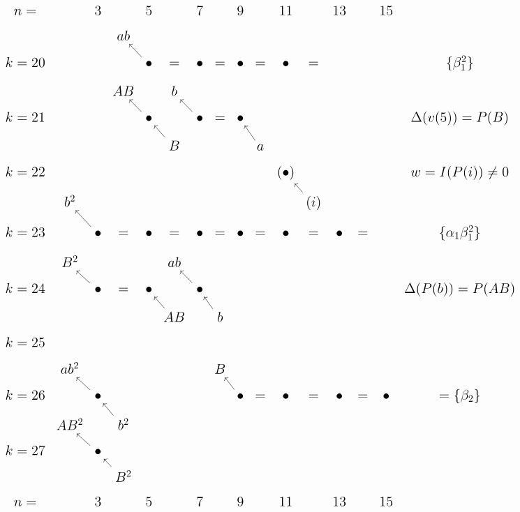 \documentclass{article}
\begin{document}
\(
\begin{tikzcd}[
nodes={font=\Large},
row sep=0.3cm,
column sep=0.1cm,
column 16/.append style={nodes={align=left,anchor=west}}
]
n= & & 3 & & 5 & & 7 & & 9 & & 11 & & 13 & & 15 & {} \\
& {}  & {}  & ab  & {} & {} \\ 
k=20 & & & & \bullet \arrow[lu] & = & \bullet & = & \bullet & = & \bullet & = & & & & \{\beta_1^2\} \\
& & & AB & & b \\
k=21 & & & & \bullet \arrow[lu] & & \bullet \arrow[lu] & = & \bullet & & & & & & & \Delta(v(5))=P(B)  \\
& & & & & B \arrow[lu] & & & & a \arrow[lu] \\
k=22 & & & & & & & & & & (\bullet) & & & & & w=I(P(i))\ne0  \\
& b^2  & & & & & & & & & & (i) \arrow[lu] \\ 
k=23 & & \bullet \arrow[lu] & = & \bullet & = & \bullet & = & \bullet & = & \bullet & = & \bullet & = & & \{\alpha_1\beta_1^2\} \\
& B^2 & & & & ab \\
k=24 & & \bullet \arrow[lu] & = & \bullet & & \bullet \arrow[lu] & & & & & & & & & \Delta(P(b))=P(AB) \\
& & & & & AB \arrow[lu] & & b \arrow[lu] \\
k=25 \\
& ab^2 & & & & & & B & & \\ 
k=26 & & \bullet \arrow[lu] & & & & & & \bullet \arrow[lu] & = & \bullet & = & \bullet & = & \bullet & = \{\beta_2\} \\
& AB^2 & & b^2 \arrow[lu] \\
k=27 & & \bullet \arrow[lu] \\
& & & B^2 \arrow[lu] \\
n= & & 3 & & 5 & & 7 & & 9 & & 11 & & 13 & & 15 & {} \\
\end{tikzcd}
\)
\end{document}
